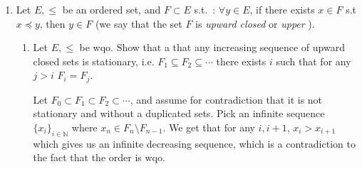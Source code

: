 \documentclass[a4paper,11pt]{exam}
\newcommand{\N}{\mathbb{N}}
\begin{document}
\begin{questions}
\begin{enumerate}
\begin{enumerate}
\begin{solution}
				\end{solution}
			\end{enumerate}
			\item Let $E,\leq$ be an ordered set, and $F\subset E$ s.t.~:
			$\forall y \in E$, if there exists $x\in F$ s.t $x \preccurlyeq y$, then
			$y\in F$ (we say that the set $F$ is \textit{upward closed} or \textit{upper} ).
			\begin{enumerate}
				\item Let $E,\leq$ be wqo. Show that a that any increasing sequence of upward closed sets is stationary, i.e. $F_1\subseteq F_2\subseteq\cdots$ there exists $i$ such that for any $j>i$ $F_i=F_j$. 
				
				\begin{solution}
					Let $F_0 \subset F_1 \subset F_2 \subset \cdots$, and assume for contradiction that it is not stationary and without a duplicated sets. Pick an infinite sequence $\{x_i\}_{i\in\N}$ where $x_n \in F_n \setminus F_{n-1}$.  
					We get that for any $i,i+1$, $x_i>x_{i+1}$ which gives us an infinite decreasing sequence, which is a contradiction to the fact that the order is wqo.   
					
				\end{solution}
				

\end{enumerate}
\end{enumerate}
\end{questions}
\end{document}
